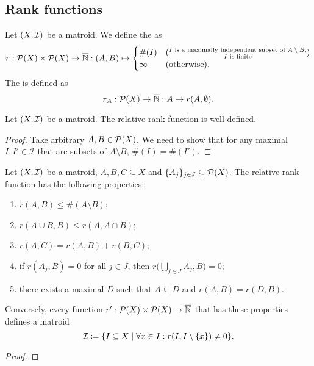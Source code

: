 \subsection{Rank functions}
\begin{definition}
Let $\left( X,\mathcal{I} \right)$ be a matroid. We define the  as
\[ r: \operatorname{\mathcal{P}}(X)\times \operatorname{\mathcal{P}}(X) \to \overline{\mathbb{N}}: (A, B) \mapsto \begin{cases}
\#(I) & (\substack{\text{$I$ is a maximally independent subset of $A\setminus B$}, \\ \text{$I$ is finite}}) \\
\infty & (\text{otherwise}).
\end{cases} \]
The  is defined as
\[ r_A: \operatorname{\mathcal{P}}(X) \to \overline{\mathbb{N}}: A \mapsto r(A, \emptyset). \]
\end{definition}

\begin{lemma}
Let $\left( X,\mathcal{I} \right)$ be a matroid. The relative rank function is well-defined.
\end{lemma}
\begin{proof}
Take arbitrary $A,B\in \operatorname{\mathcal{P}}(X)$. We need to show that for any maximal $I,I'\in \mathcal{I}$ that are subsets of $A\setminus B$, $\#(I) = \#(I')$.
\end{proof}

\begin{proposition}
Let $\left( X,\mathcal{I} \right)$ be a matroid, $A,B,C\subseteq X$ and $\{A_j\}_{j\in J}\subseteq \operatorname{\mathcal{P}}(X)$. The relative rank function has the following properties:
\begin{enumerate}
\item $r(A,B) \leq \#(A\setminus B)$;
\item $r(A\cup B, B) \leq r(A, A\cap B)$;
\item $r(A,C) = r(A,B)+ r(B,C)$;
\item if $r(A_j, B)=0$ for all $j\in J$, then $r\big(\bigcup_{j\in J}A_j, B) = 0$;
\item there exists a maximal $D$ such that $A\subseteq D$ and $r(A,B) = r(D, B)$.
\end{enumerate}
Conversely, every function $r': \operatorname{\mathcal{P}}(X)\times \operatorname{\mathcal{P}}(X) \to \overline{\mathbb{N}}$ that has these properties defines a matroid
\[ \mathcal{I} \defeq \setbuilder{I\subseteq X}{\forall x\in I: r(I, I\setminus\{x\})\neq 0}. \]
\end{proposition}
\begin{proof}

\end{proof}


